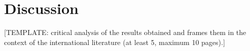 \chapter{Discussion}

[TEMPLATE: critical analysis of the results obtained and frames them in the context of the international literature (at least 5, maximum 10 pages).]